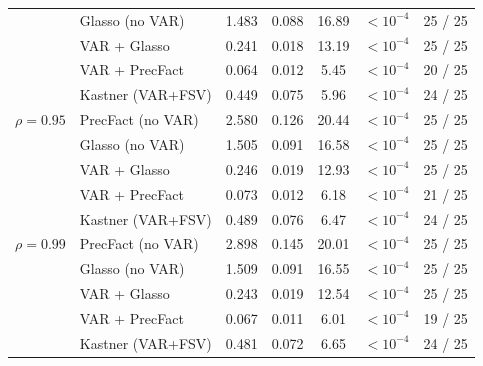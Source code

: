\begin{table}[h!]
\begin{tabular}{llccccc}
              & Glasso (no VAR)    & 1.483 & 0.088 & 16.89 & $<10^{-4}$ & 25 / 25 \\
              & VAR + Glasso       & 0.241 & 0.018 & 13.19 & $<10^{-4}$ & 25 / 25 \\
              & VAR + PrecFact     & 0.064 & 0.012 &  5.45 & $<10^{-4}$ & 20 / 25 \\
              & Kastner (VAR+FSV)  & 0.449 & 0.075 &  5.96 & $<10^{-4}$ & 24 / 25 \\
\midrule
$\rho = 0.95$ & PrecFact (no VAR)  & 2.580 & 0.126 & 20.44 & $<10^{-4}$ & 25 / 25 \\
              & Glasso (no VAR)    & 1.505 & 0.091 & 16.58 & $<10^{-4}$ & 25 / 25 \\
              & VAR + Glasso       & 0.246 & 0.019 & 12.93 & $<10^{-4}$ & 25 / 25 \\
              & VAR + PrecFact     & 0.073 & 0.012 &  6.18 & $<10^{-4}$ & 21 / 25 \\
              & Kastner (VAR+FSV)  & 0.489 & 0.076 &  6.47 & $<10^{-4}$ & 24 / 25 \\
\midrule
$\rho = 0.99$ & PrecFact (no VAR)  & 2.898 & 0.145 & 20.01 & $<10^{-4}$ & 25 / 25 \\
              & Glasso (no VAR)    & 1.509 & 0.091 & 16.55 & $<10^{-4}$ & 25 / 25 \\
              & VAR + Glasso       & 0.243 & 0.019 & 12.54 & $<10^{-4}$ & 25 / 25 \\
              & VAR + PrecFact     & 0.067 & 0.011 &  6.01 & $<10^{-4}$ & 19 / 25 \\
              & Kastner (VAR+FSV)  & 0.481 & 0.072 &  6.65 & $<10^{-4}$ & 24 / 25 \\
\bottomrule
\end{tabular}
\end{table}

